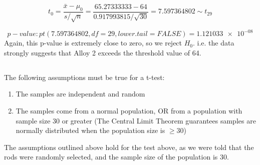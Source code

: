 \documentclass[letterpaper]{article}
\begin{document}
$$t_0 = \frac{\bar{x}-\mu_0}{s/\sqrt{n}} = \frac{65.27333333 - 64}{0.917993815/\sqrt{30}} =  7.597364802 \sim t_{29}$$

$$ {p-value}: pt(7.597364802, df=29, lower.tail=FALSE) = \SI{1.121033e-08} $$
Again, this p-value is extremely close to zero, so we reject $H_0$.
i.e. the data strongly suggests that Alloy 2 exceeds the threshold value of 64.

\subsection{}%
%
The following assumptions must be true for a t-test:
\begin{enumerate}
 \item The samples are independent and random
 \item The samples come from a normal population,
       OR from a population with sample size 30 or greater
       (The Central Limit Theorem guarantees samples are normally distributed
       when the population size is $\geq 30$)
\end{enumerate}

The assumptions outlined above hold for the test above, as we were told that the
rods were randomly selected, and the sample size of the population is 30.

\section{}%

\subsection{}%
\end{document}

